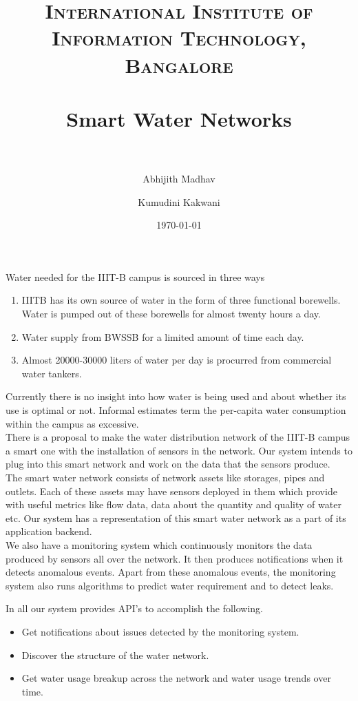 \documentclass[paper=a4, fontsize=11pt]{scrartcl} %
\title{	
\normalfont \normalsize 
\textsc{International Institute of Information Technology, Bangalore} \\ [25pt] %
\horrule{0.5pt} \\[0.4cm] %
\huge Smart Water Networks \\ %
\horrule{2pt} \\[0.5cm] %
}
\author{Abhijith Madhav \and Kumudini Kakwani} %
\date{\normalsize\today} %
\numberwithin{equation}{section} %
\numberwithin{figure}{section} %
\numberwithin{table}{section} %
\begin{document}
\maketitle %



Water needed for the IIIT-B campus is sourced in three ways
\begin{enumerate}
\item
IIITB has its own source of water in the form of three functional borewells. Water is pumped out of these borewells for almost twenty hours a day. 
\item
Water supply from BWSSB for a limited amount of time each day.
\item
Almost 20000-30000 liters of water per day is procurred from commercial water tankers.
\end{enumerate}
Currently there is no insight into how water is being used and about whether its use is optimal or not. Informal estimates term the per-capita water consumption within the campus as excessive.\\

There is a proposal to make the water distribution network of the IIIT-B campus a smart one with the installation of sensors in the network. Our system intends to plug into this smart network and work on the data that the sensors produce. \\

The smart water network consists of network assets like storages, pipes and outlets. Each of these assets may have sensors deployed in them which provide with useful metrics like flow data, data about the quantity and quality of water etc. Our system has a representation of this smart water network as a part of its application backend. \\

We also have a monitoring system which continuously monitors the data produced by sensors all over the network. It then produces notifications when it detects anomalous events. Apart from these anomalous events, the monitoring system also runs algorithms to predict water requirement and to detect leaks.

In all our system provides API's to accomplish the following.
\begin{itemize}
\item Get notifications about issues detected by the monitoring system.
\item Discover the structure of the water network.
\item Get water usage breakup across the network and water usage trends over time.
\end{itemize}
\end{document}
